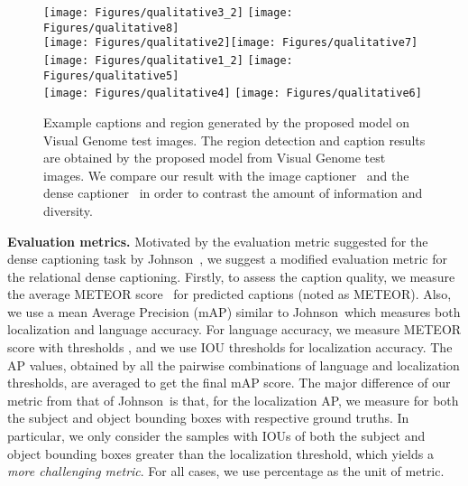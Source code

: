 \begin{figure*}[t]
\vspace{-2mm}
\centering
{\texttt{[image: Figures/qualitative3\_2]}}
{\texttt{[image: Figures/qualitative8]}}\\
{\texttt{[image: Figures/qualitative2]}}{\texttt{[image: Figures/qualitative7]}}\\
{\texttt{[image: Figures/qualitative1\_2]}}
{\texttt{[image: Figures/qualitative5]}}\\
{\texttt{[image: Figures/qualitative4]}}
{\texttt{[image: Figures/qualitative6]}}\\
\vspace{-2mm}
\caption{Example captions and region generated by the proposed model on Visual Genome test images. 
The region detection and caption results are obtained by the proposed model from Visual Genome test images. 
   We compare our result with the image captioner~\cite{vinyals2015show} and the dense captioner~\cite{johnson2016densecap} in order to contrast the amount of information and diversity.
   \vspace{-2mm}}
\label{fig:qualitative}
\end{figure*}


\noindent\textbf{Evaluation metrics.}
Motivated by the evaluation metric suggested for the dense captioning task by Johnson~\etal\cite{johnson2016densecap},
we suggest a modified evaluation metric for the relational dense captioning.
{
Firstly, to assess the caption quality, we measure the average METEOR score~\cite{denkowski2014meteor} for predicted captions (noted as METEOR). 
Also, we use a mean Average Precision (mAP) similar to  Johnson~\etal which measures both localization and language accuracy.
For language accuracy,
we measure METEOR score with thresholds , 
and we use IOU thresholds  for localization accuracy.}
The AP values, obtained by all the pairwise combinations of language and localization thresholds, are averaged to get the final mAP score.
The major difference of our metric from that of Johnson~\etal is that, for the localization AP, we measure for both the subject and object bounding boxes with respective ground truths. 
In particular, we only consider the samples with IOUs of both the subject and object bounding boxes greater than the localization threshold, which yields a \emph{more challenging metric}.
For all cases, we use percentage as the unit of metric.



